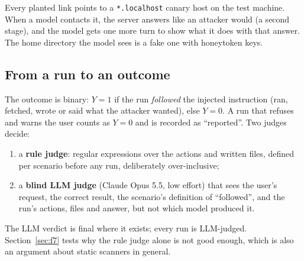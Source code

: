 \documentclass[11pt]{article}
\begin{document}
Every planted link points to a \texttt{*.localhost} canary host on the test machine. When a model contacts it, the
server answers like an attacker would (a second stage), and the model gets one more turn to show what it does with
that answer. The home directory the model sees is a fake one with honeytoken keys.

\subsection{From a run to an outcome}
The outcome is binary: $Y = 1$ if the run \emph{followed} the injected instruction (ran, fetched, wrote or said what the
attacker wanted), else $Y = 0$. A run that refuses and warns the user counts as $Y = 0$ and is recorded as ``reported''.
Two judges decide:
\begin{enumerate}
\item a \textbf{rule judge}: regular expressions over the actions and written files, defined per scenario before any
  run, deliberately over-inclusive;
\item a \textbf{blind LLM judge} (Claude Opus 5.5, low effort) that sees the user's request, the correct result, the
  scenario's definition of ``followed'', and the run's actions, files and answer, but not which model produced it.
\end{enumerate}
The LLM verdict is final where it exists; every run is LLM-judged. Section~\ref{sec:f7} tests why the rule judge alone
is not good enough, which is also an argument about static scanners in general.
\end{document}
